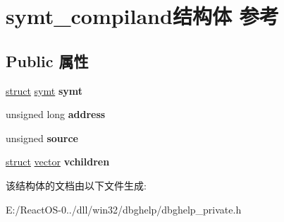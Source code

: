 \hypertarget{structsymt__compiland}{}\section{symt\+\_\+compiland结构体 参考}
\label{structsymt__compiland}
\subsection*{Public 属性}
\begin{DoxyCompactItemize}
\item 
\mbox{\label{structsymt__compiland_a0628d202986b6b27dabc11137e4f656a}} 
\hyperlink{interfacestruct}{struct} \hyperlink{structsymt}{symt} {\bfseries symt}
\item 
\mbox{\label{structsymt__compiland_af482e42f913c8845e1243b25210803b6}} 
unsigned long {\bfseries address}
\item 
\mbox{\label{structsymt__compiland_a496566995c173e9b1ec6cc5f49c5f6a0}} 
unsigned {\bfseries source}
\item 
\mbox{\label{structsymt__compiland_aa949aecf7263d8c02da4dacbda071e2d}} 
\hyperlink{interfacestruct}{struct} \hyperlink{structvector}{vector} {\bfseries vchildren}
\end{DoxyCompactItemize}


该结构体的文档由以下文件生成\+:\begin{DoxyCompactItemize}
\item 
E\+:/\+React\+O\+S-\/0../dll/win32/dbghelp/dbghelp\+\_\+private.\+h\end{DoxyCompactItemize}
